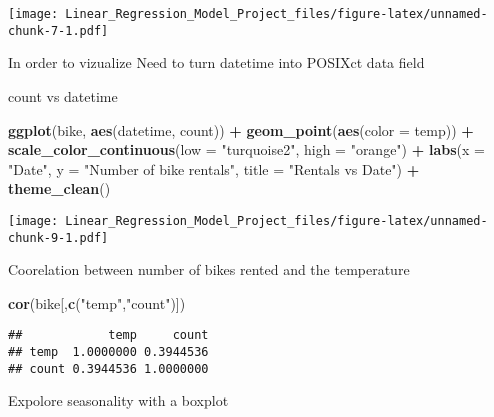 \documentclass[]{article}
\newenvironment{Shaded}{\begin{snugshade}}{\end{snugshade}}
\newcommand{\KeywordTok}[1]{\textcolor[rgb]{0.13,0.29,0.53}{\textbf{#1}}}
\newcommand{\DataTypeTok}[1]{\textcolor[rgb]{0.13,0.29,0.53}{#1}}
\newcommand{\StringTok}[1]{\textcolor[rgb]{0.31,0.60,0.02}{#1}}
\newcommand{\OperatorTok}[1]{\textcolor[rgb]{0.81,0.36,0.00}{\textbf{#1}}}
\newcommand{\NormalTok}[1]{#1}
\begin{document}
\texttt{[image: Linear\_Regression\_Model\_Project\_files/figure-latex/unnamed-chunk-7-1.pdf]}

In order to vizualize Need to turn datetime into POSIXct data field

\begin{Shaded}
\end{Shaded}

count vs datetime

\begin{Shaded}
\begin{Highlighting}[]
\KeywordTok{ggplot}\NormalTok{(bike, }\KeywordTok{aes}\NormalTok{(datetime, count)) }\OperatorTok{+}
\StringTok{    }\KeywordTok{geom_point}\NormalTok{(}\KeywordTok{aes}\NormalTok{(}\DataTypeTok{color =}\NormalTok{ temp)) }\OperatorTok{+}
\StringTok{    }\KeywordTok{scale_color_continuous}\NormalTok{(}\DataTypeTok{low =} \StringTok{"turquoise2"}\NormalTok{, }\DataTypeTok{high =} \StringTok{"orange"}\NormalTok{) }\OperatorTok{+}
\StringTok{    }\KeywordTok{labs}\NormalTok{(}\DataTypeTok{x =} \StringTok{"Date"}\NormalTok{, }\DataTypeTok{y =} \StringTok{"Number of bike rentals"}\NormalTok{, }\DataTypeTok{title =} \StringTok{"Rentals vs Date"}\NormalTok{) }\OperatorTok{+}
\StringTok{    }\KeywordTok{theme_clean}\NormalTok{()}
\end{Highlighting}
\end{Shaded}

\texttt{[image: Linear\_Regression\_Model\_Project\_files/figure-latex/unnamed-chunk-9-1.pdf]}

Coorelation between number of bikes rented and the temperature

\begin{Shaded}
\begin{Highlighting}[]
\KeywordTok{cor}\NormalTok{(bike[,}\KeywordTok{c}\NormalTok{(}\StringTok{"temp"}\NormalTok{,}\StringTok{"count"}\NormalTok{)])}
\end{Highlighting}
\end{Shaded}

\begin{verbatim}
##            temp     count
## temp  1.0000000 0.3944536
## count 0.3944536 1.0000000
\end{verbatim}

Expolore seasonality with a boxplot
\end{document}
